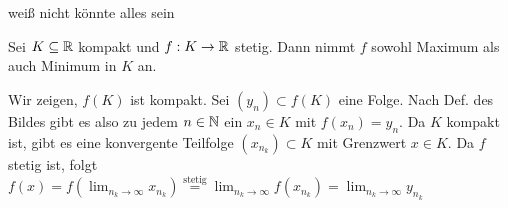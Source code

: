 \begin{subtheorem}
	weiß nicht könnte alles sein
\end{subtheorem}

\begin{subtheorem}
	Sei $ K \subseteq \mathbb{R}  $ kompakt und $ f:K\to \mathbb{R}  $ stetig. Dann nimmt $ f $ sowohl Maximum als auch Minimum in $ K $ an.
\end{subtheorem}
\begin{subproof*}
	Wir zeigen, $ f(K) $ ist kompakt. Sei $ (y_n) \subset f(K) $ eine Folge. Nach Def. des Bildes gibt es also zu jedem $ n \in \mathbb{N} $ ein $ x_n \in K $ mit $ f(x_n) = y_n $.
	Da $ K $ kompakt ist, gibt es eine konvergente Teilfolge $ (x_{n_k}) \subset K $ mit Grenzwert $ x \in K $. Da $ f $ stetig ist, folgt $ f(x) = f(\lim_{n_k \to \infty} x_{n_k}) \overset{\text{stetig} }{=} \lim_{n_k \to \infty} f(x_{n_k}) = \lim_{n_k \to \infty} y_{n_k} $
\end{subproof*}



